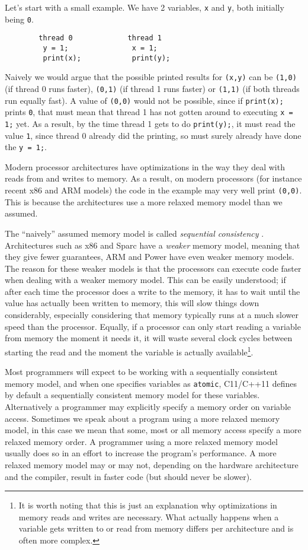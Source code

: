 \documentclass[journal]{IEEEtran}
\begin{document}
Let's start with a small example.
We have 2 variables, \texttt{x} and \texttt{y}, both initially being \texttt{0}.
\begin{lstlisting}
        thread 0             thread 1
         y = 1;               x = 1;
         print(x);            print(y);
\end{lstlisting}
Naively we would argue that the possible printed results for \texttt{(x,y)} can be \texttt{(1,0)} (if thread 0 runs faster), \texttt{(0,1)} (if thread 1 runs faster) or \texttt{(1,1)} (if both threads run equally fast).
A value of \texttt{(0,0)} would not be possible, since if \texttt{print(x);} prints \texttt{0}, that must mean that thread 1 has not gotten around to executing \texttt{x = 1;} yet.
As a result, by the time thread 1 gets to do \texttt{print(y);}, it must read the value \texttt{1}, since thread 0 already did the printing, so must surely already have done the \texttt{y = 1;}.

Modern processor architectures have optimizations in the way they deal with reads from and writes to memory.
As a result, on modern processors (for instance recent x86 and ARM models) the code in the example may very well print \texttt{(0,0)}.
This is because the architectures use a more relaxed memory model than we assumed.

The ``naively'' assumed memory model is called \emph{sequential consistency} \cite{lamport1979make}.
Architectures such as x86 and Sparc have a \emph{weaker} memory model, meaning that they give fewer guarantees, ARM and Power have even weaker memory models.
The reason for these weaker models is that the processors can execute code faster when dealing with a weaker memory model.
This can be easily understood; if after each time the processor does a write to the memory, it has to wait until the value has actually been written to memory, this will slow things down considerably, especially considering that memory typically runs at a much slower speed than the processor.
Equally, if a processor can only start reading a variable from memory the moment it needs it, it will waste several clock cycles between starting the read and the moment the variable is actually available\footnote{It is worth noting that this is just an explanation why optimizations in memory reads and writes are necessary. What actually happens when a variable gets written to or read from memory differs per architecture and is often more complex.}.

Most programmers will expect to be working with a sequentially consistent memory model, and when one specifies variables as \texttt{atomic}, C11/C++11 defines by default a sequentially consistent memory model for these variables.
Alternatively a programmer may explicitly specify a memory order on variable access.
Sometimes we speak about a program using a more relaxed memory model, in this case we mean that some, most or all memory access specify a more relaxed memory order.
A programmer using a more relaxed memory model usually does so in an effort to increase the program's performance.
A more relaxed memory model may or may not, depending on the hardware architecture and the compiler, result in faster code (but should never be slower).
\end{document}
